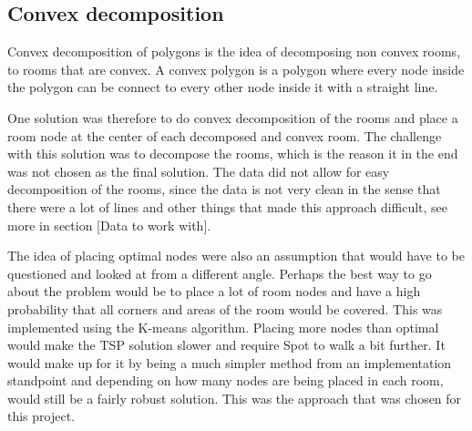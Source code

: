 \subsection{Convex decomposition}
Convex decomposition of polygons is the idea of decomposing non convex rooms, to rooms that are convex. A convex polygon is a polygon where every node inside the polygon can be connect to every other node inside it with a straight line.

One solution was therefore to do convex decomposition of the rooms and place a room node at the center of each decomposed and convex room. 
The challenge with this solution was to decompose the rooms, which is the reason it in the end was not chosen as the final solution. The data did not allow for easy decomposition of the rooms, since the data is not very clean in the sense that there were a lot of lines and other things that made this approach difficult, see more in section [Data to work with].

The idea of placing optimal nodes were also an assumption that would have to be questioned and looked at from a different angle. Perhaps the best way to go about the problem would be to place a lot of room nodes and have a high probability that all corners and areas of the room would be covered. This was implemented using the K-means algorithm. 
Placing more nodes than optimal would make the TSP solution slower and require Spot to walk a bit further. It would make up for it by being a much simpler method from an implementation standpoint and depending on how many nodes are being placed in each room, would still be a fairly robust solution. This was the approach that was chosen for this project. 


